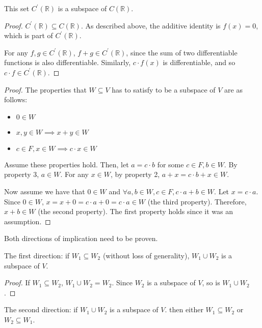 
This set $C^\prime(\mathbb{R})$ is a subspace of $C(\mathbb{R})$.

\begin{proof}
    $C^\prime(\mathbb{R}) \subseteq C(\mathbb{R})$. As described above, the additive identity is $f(x) = 0$, which is part of $C^\prime(\mathbb{R})$.

    For any $f, g \in C^\prime(\mathbb{R})$, $f + g \in C^\prime(\mathbb{R})$, since the sum of two differentiable functions is also differentiable. Similarly, $c \cdot f(x)$ is differentiable, and so $c \cdot f \in C^\prime(\mathbb{R})$.
\end{proof}


\begin{proof}
    The properties that $W \subseteq V$ has to satisfy to be a subspace of $V$ are as follows:

    \begin{itemize}
        \item $0 \in W$
        \item $x, y \in W \implies x + y \in W$
        \item $c \in F, x \in W \implies c \cdot x \in W$
    \end{itemize}

    Assume these properties hold. Then, let $a = c \cdot b$ for some $c \in F, b \in W$. By property 3, $a \in W$. For any $x \in W$, by property 2, $a + x = c \cdot b + x \in W$.

    Now assume we have that $0 \in W$ and $\forall a, b \in W, c \in F, c \cdot a + b \in W$. Let $x = c \cdot a$. Since $0 \in W$, $x = x + 0 = c \cdot a + 0 = c \cdot a \in W$ (the third property). Therefore, $x + b \in W$ (the second property). The first property holds since it was an assumption.
\end{proof}


Both directions of implication need to be proven.

The first direction: if $W_1 \subseteq W_2$ (without loss of generality), $W_1 \cup W_2$ is a subspace of $V$.
\begin{proof}
    If $W_1 \subseteq W_2$, $W_1 \cup W_2 = W_2$. Since $W_2$ is a subspace of $V$, so is $W_1 \cup W_2$.
\end{proof}

The second direction: if $W_1 \cup W_2$ is a subspace of $V$. then either $W_1 \subseteq W_2$ or $W_2 \subseteq W_1$.

